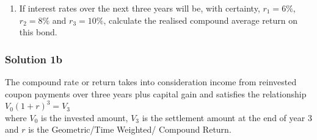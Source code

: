 \documentclass[12]{article}
\begin{document}
\color{black}
\begin{enumerate}
    \item[b)] If interest rates over the next three years will be, with certainty, $r_1 = 6\%$, $r_2 = 8\%$ and $r_3 = 10\%$, calculate the realised compound average return on this bond.
\end{enumerate}


\color{blue}
\subsubsection*{Solution 1b}
\noindent
The compound rate or return takes into consideration income from reinvested coupon payments over three years plus capital gain and satisfies the relationship $V_0(1+r)^3 = V_3$\\
where $V_0$ is the invested amount, $V_3$ is the settlement amount at the end of year 3 and $r$ is the Geometric/Time Weighted/ Compound Return. 


\begin{table}[H]
    \centering
    \label{tab:my_label}
\end{table}
\end{document}
